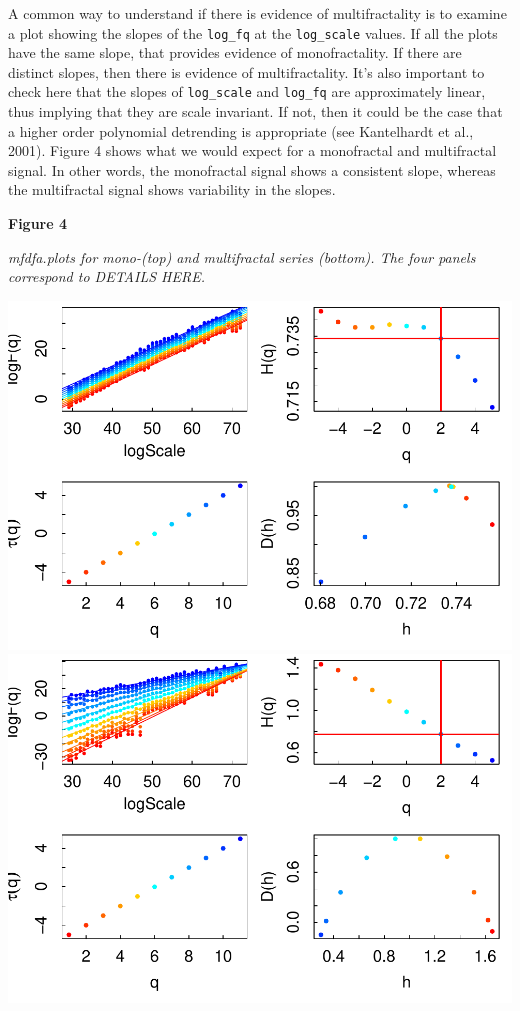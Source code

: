 \documentclass[
  man]{apa6}
\begin{document}
A common way to understand if there is evidence of multifractality is to
examine a plot showing the slopes of the \texttt{log\_fq} at the \texttt{log\_scale}
values. If all the plots have the same slope, that provides evidence of
monofractality. If there are distinct slopes, then there is evidence of
multifractality. It's also important to check here that the slopes of
\texttt{log\_scale} and \texttt{log\_fq} are approximately linear, thus implying that
they are scale invariant. If not, then it could be the case that a
higher order polynomial detrending is appropriate (see Kantelhardt et
al., 2001). Figure 4 shows what we would expect for a monofractal and
multifractal signal. In other words, the monofractal signal shows a
consistent slope, whereas the multifractal signal shows variability in
the slopes.

\textbf{Figure 4}

\emph{mfdfa.plots for mono-(top) and multifractal series (bottom). The four
panels correspond to DETAILS HERE.}

\includegraphics{fractal_regression_paper_brm_files/figure-latex/unnamed-chunk-10-1.pdf} \includegraphics{fractal_regression_paper_brm_files/figure-latex/unnamed-chunk-10-2.pdf}
\end{document}
